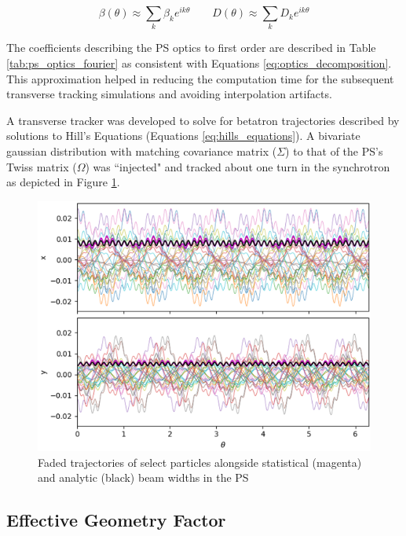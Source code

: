 \begin{equation}
    \beta(\theta) \approx \sum_k \beta_k e^{i k\theta} \qquad D(\theta) \approx \sum_k D_k e^{i k\theta}
    \label{eq:optics_decomposition}
\end{equation}

The coefficients describing the PS optics to first order are described in Table \ref{tab:ps_optics_fourier} as consistent with Equations \ref{eq:optics_decomposition}. This approximation helped in reducing the computation time for the subsequent transverse tracking simulations and avoiding interpolation artifacts.



A transverse tracker was developed to solve for betatron trajectories described by solutions to Hill's Equations (Equations  \ref{eq:hills_equations}). A bivariate gaussian distribution with matching covariance matrix ($\Sigma$) to that of the PS's Twiss matrix ($\Omega$) was ``injected" and tracked about one turn in the synchrotron as depicted in Figure \ref{fig:trans_tracking}.

\begin{figure}
    \centering
    \includegraphics{figs/transverse_tracking.png}
    \caption{Faded trajectories of select particles alongside statistical (magenta) and analytic (black) beam widths in the PS}
    \label{fig:trans_tracking}
\end{figure}

\subsection{Effective Geometry Factor}

